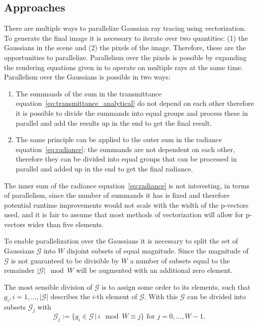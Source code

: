 \documentclass[a4paper, 11pt]{memoir}
\begin{document}
    \subsection{Approaches}
    There are multiple ways to parallelize Gaussian ray tracing using vectorization. To generate the final image it is
    necessary to iterate over two quantities: (1) the Gaussians in the scene and (2) the pixels of the image. Therefore,
    these are the opportunities to parallelize. Parallelism over the pixels is possible by expanding the rendering equations
    given in \cite{Rhodin:2015} to operate on multiple rays at the same time. Parallelism over the Gaussians is possible
    in two ways:
    \begin{enumerate}
        \item The summands of the sum in the \gls{transmittance} equation~\eqref{eq:transmittance_analytical} do not
            depend on each other therefore it is possible to divide the summands into equal groups and process these in
            parallel and add the results up in the end to get the final result.
        \item The same principle can be applied to the outer sum in the \gls{radiance} equation~\eqref{eq:radiance}:
            the summands are not dependent on each other, therefore they can be divided into equal groups that can
            be processed in parallel and added up in the end to get the final \gls{radiance}.
    \end{enumerate}
    The inner sum of the \gls{radiance} equation~\eqref{eq:radiance} is not interesting, in terms of parallelism, since
    the number of summands it has is fixed and therefore potential runtime improvements would not scale with the width
    of the p-vectors used, and it is fair to assume that most methods of vectorization will allow for p-vectors wider
    than five elements.

    To enable parallelization over the Gaussians it is necessary to split the set of Gaussians $\mathcal{G}$ into $W$
    disjoint subsets of equal magnitude. Since the magnitude of $\mathcal{G}$ is not guaranteed to be divisible by $W$
    a number of subsets equal to the remainder $|\mathcal{G}| \mod W$ will be augmented with an additional zero element.

    The most sensible division of $\mathcal{G}$ is to assign some order to its elements, such that $g_i, i=1,\dots,|\mathcal{G}|$
    describes the $i$-th element of $\mathcal{G}$. With this $\mathcal{G}$ can be divided into subsets $\mathcal{G}_j$ with
    \begin{equation}
        \mathcal{G}_j := \{ g_i \in \mathcal{G} \,|\, i \mod W \equiv j \} \text{ for } j=0,\dots,W-1.
    \end{equation}
\end{document}
